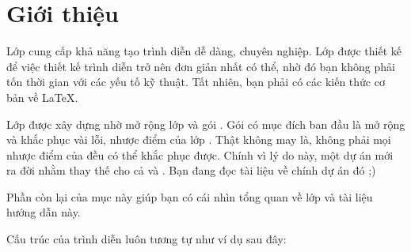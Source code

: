 \section{\texorpdfstring{Giới thiệu}{Gioi thieu}}
\label{sec:intro}

Lớp  cung cấp khả năng tạo trình diễn dễ dàng, chuyên nghiệp.
Lớp được thiết kế để việc thiết kế trình diễn trở nên đơn giản nhất có thể,
nhờ đó bạn không phải tốn thời gian với các yếu tố kỹ thuật.
Tất nhiên, bạn phải có các kiến thức cơ bản về \LaTeX{}.

Lớp được xây dựng nhờ mở rộng lớp  \cite{prosper}
và gói  \cite{HA-prosper}. Gói 
có mục đích ban đầu là mở rộng và khắc phục vài lỗi, nhược điểm của lớp
. Thật không may là, không phải mọi nhược điểm của 
đều có thể khắc phục được. Chính vì lý do này, một dự án mới ra đời
nhằm thay thế cho cả  và .
Bạn đang đọc tài liệu về chính dự án đó ;)

Phần còn lại của mục này giúp bạn có cái nhìn tổng quan về lớp 
và tài liệu hướng dẫn này.

Cấu trúc của trình diễn luôn tương tự như ví dụ sau đây:

